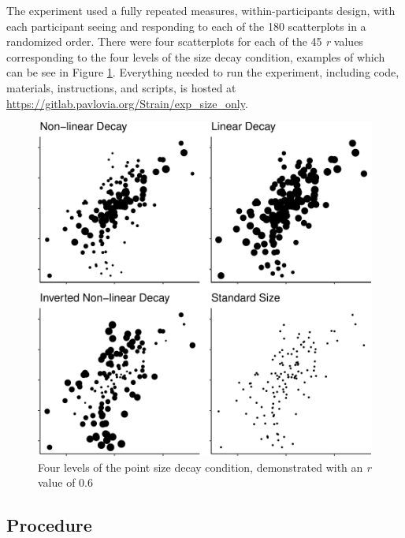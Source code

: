 \documentclass{vgtc}                          %
\begin{document}
The experiment used a fully repeated measures, within-participants design, with each
participant seeing and responding to each of the 180 scatterplots in a randomized order.
There were four scatterplots for each of the 45 \emph{r} values corresponding to the
four levels of the size decay condition, examples of which can be see in Figure \ref{fig:examples}.
Everything needed to run the experiment, including code, materials, instructions, and scripts, is
hosted at \url{https://gitlab.pavlovia.org/Strain/exp_size_only}.

\begin{figure}
\includegraphics[width=1\linewidth]{size_and_scatterplots_files/figure-latex/examples-1} \caption{Four levels of the point size decay condition, demonstrated with an \textit{r} value of 0.6}\label{fig:examples}
\end{figure}

\hypertarget{procedure}{%
\subsection{Procedure}\label{procedure}}
\end{document}
